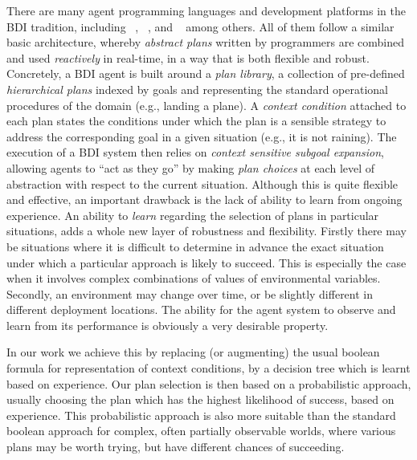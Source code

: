 There are many agent programming languages and development platforms
in the BDI tradition, including
\JACK~\cite{BusettaRHL:AL99-JACK}, 
\JADEX~\cite{PokahrBL:EXP03-JADEX}, and
\JASON~\cite{jasonbook}
among others. 
All of them
follow a similar basic architecture, whereby \emph{abstract plans}
written by programmers are combined and used \emph{reactively} in
real-time, in a way that is both flexible and robust. Concretely, a
BDI agent is built around a \textit{plan library}, a collection of
pre-defined \textit{hierarchical plans} indexed by goals and
representing the standard operational procedures of the domain (e.g.,
landing a plane).
%
A \emph{context condition} attached to each plan states the
conditions under which the plan is a sensible strategy to address the
corresponding goal in a given situation (e.g., it is not raining). The execution
of a BDI system then relies on \textit{context sensitive subgoal
expansion}, allowing agents to ``act as they go'' by making \emph{plan choices}
at each level of abstraction with respect to the current situation.
%
Although this is quite flexible and effective, an important drawback
is the lack of ability to learn from ongoing experience. An ability to
{\it learn} regarding the selection of plans in particular situations,
adds a whole new layer of robustness and flexibility. Firstly there
may be situations where it is difficult to determine in advance the
exact situation under which a particular approach is likely to
succeed. This is especially the case when it involves complex combinations of
values of environmental variables. Secondly, an environment may change
over time, or be slightly different in different deployment
locations. The ability for the agent system to observe and learn
from its performance is obviously a very desirable property.

In our work we achieve this by replacing (or augmenting) the usual
boolean formula for representation of context conditions, by a
decision tree \cite{Mitchell97:ML} which is learnt based on
experience. Our plan selection is then based on a probabilistic
approach, usually choosing the plan which has the highest likelihood
of success, based on experience. This probabilistic approach is also
more suitable than the standard boolean approach for complex, often
partially observable worlds, where various plans may be worth trying,
but have different chances of succeeding.

